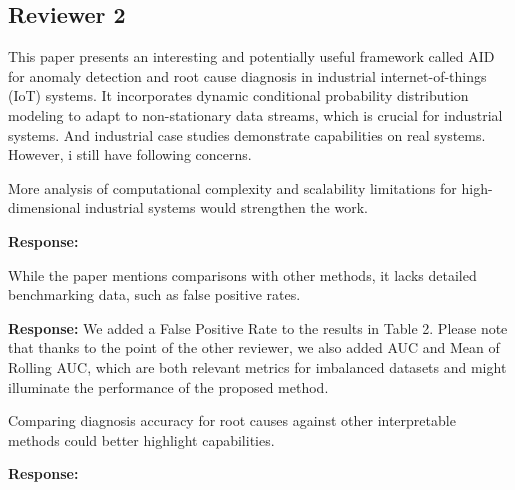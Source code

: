 \documentclass{article}
\makeatletter
\newenvironment{comment}{
\begin{sloppypar}\slshape
\vspace{5 mm}
\color{blue}
 \@beginparpenalty\@M
  \begin{list}{}{\setlength{\topsep}{0ex}%
  \setlength{\leftmargin}{\rightmargin}}\item[]
 \@beginparpenalty\@endparpenalty
}
{\end{list}
\end{sloppypar}
}
\makeatother
\begin{document}
\subsection*{Reviewer 2}
\begin{comment}
This paper presents an interesting and potentially useful framework called AID for anomaly detection and root cause diagnosis in industrial internet-of-things (IoT) systems. It incorporates dynamic conditional probability distribution modeling to adapt to non-stationary data streams, which is crucial for industrial systems. And industrial case studies demonstrate capabilities on real systems. However, i still have following concerns.
\end{comment}

\begin{enumerate}
  \item
        \begin{comment}
        More analysis of computational complexity and scalability limitations for high-dimensional industrial systems would strengthen the work.
        \end{comment}
        {\bf Response:}
  \item
        \begin{comment}
        While the paper mentions comparisons with other methods, it lacks detailed benchmarking data, such as false positive rates.
        \end{comment}
        {\bf Response:}
        We added a False Positive Rate to the results in Table 2. Please note that thanks to the point of the other reviewer, we also added AUC and Mean of Rolling AUC, which are both relevant metrics for imbalanced datasets and might illuminate the performance of the proposed method. 
  \item
        \begin{comment}
        Comparing diagnosis accuracy for root causes against other interpretable methods could better highlight capabilities.
        \end{comment}
        {\bf Response:}
\end{enumerate}


\end{document}
